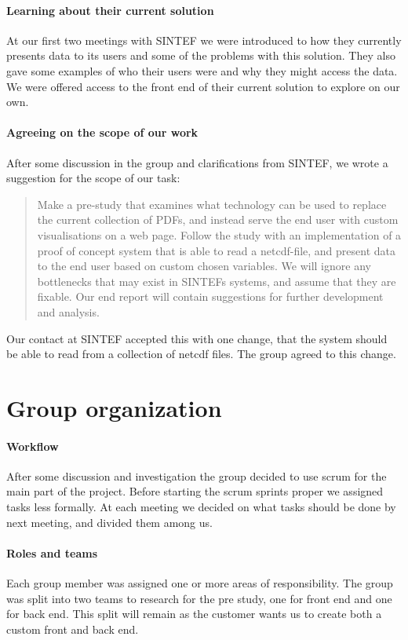 \documentclass[11pt,a4paper,titlepage,oneside]{report}
\begin{document}
\paragraph{Learning about their current solution}
At our first two meetings with SINTEF we were introduced to how they currently presents data to its users and some of the problems with this solution. They also gave some examples of who their users were and why they might access the data. We were offered access to the front end of their current solution to explore on our own.

\paragraph{Agreeing on the scope of our work}
After some discussion in the group and clarifications from SINTEF, we wrote a suggestion for the scope of our task: 
\begin{quote} Make a \gls{pre-study} that examines what technology can be used to replace the current collection of PDFs, and instead serve the end user with custom visualisations on a web page. Follow the study with an implementation of a \gls{proof of concept} system that is able to read a \gls{netcdf}-file, and present data to the end user based on custom chosen variables. We will ignore any bottlenecks that may exist in SINTEFs systems, and assume that they are fixable. Our end report will contain suggestions for further development and analysis.
\end{quote}
Our contact at SINTEF accepted this with one change, that the system should be able to read from a collection of \gls{netcdf} files. The group agreed to this change.

\section{Group organization}
\paragraph{Workflow}
After some discussion and investigation the group decided to use scrum for the main part of the project. Before starting the scrum sprints proper we assigned tasks less formally. At each meeting we decided on what tasks should be done by next meeting, and divided them among us.

\paragraph{Roles and teams}
Each group member was assigned one or more areas of responsibility. The group was split into two teams to research for the pre study, one for front end and one for back end. This split will remain as the customer wants us to create both a custom front and back end.
\end{document}
